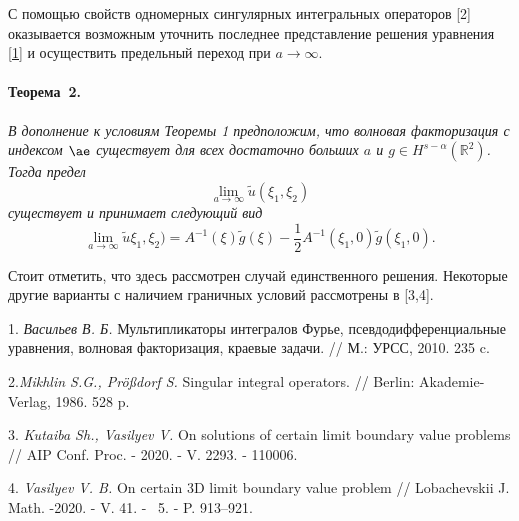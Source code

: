 \documentclass{vzmsthesis}
\begin{document}
С помощью свойств одномерных сингулярных интегральных операторов [2] оказывается возможным уточнить последнее представление решения уравнения \eqref{1} и осуществить предельный переход при $a\to\infty$.

\paragraph{Теорема~2.} {\it
В дополнение к условиям Теоремы 1 предположим, что волновая факторизация с индексом $\ae$ существует для всех достаточно больших $a$ и $g\in H^{s-\alpha}(\mathbb R^2)$. Тогда предел
\[
\lim\limits_{a\to\infty}\tilde u(\xi_1,\xi_2)
\]
существует и  принимает следующий вид
\[
\lim\limits_{a\to\infty}\tilde u\xi_1,\xi_2)=A^{-1}(\xi)\tilde g(\xi)-\frac{1}{2}A^{-1}(\xi_1,0)\tilde g(\xi_1,0).
\]
}

Стоит отметить, что здесь рассмотрен случай единственного решения. Некоторые другие варианты
с наличием граничных условий рассмотрены в [3,4].

1. {\it Васильев В. Б.} Мультипликаторы интегралов Фурье, псевдодифференциальные уравнения, волновая факторизация, краевые задачи. // М.: УРСС, 2010. 235  c.

2.{\it Mikhlin S.G., Pr\"o{\ss}dorf S.}
Singular integral operators. // Berlin: Akademie-Verlag, 1986. 528 p.

3. {\it Kutaiba Sh., Vasilyev V.} On solutions of certain limit boundary value
problems // AIP Conf. Proc. - 2020. - V. 2293. - 110006.

4. {\it Vasilyev V. B.} On certain 3D limit boundary value problem // Lobachevskii J. Math. -2020. - V. 41. - \No~5. - P. 913--921.
\end{document}
